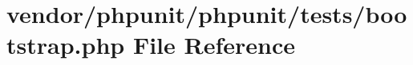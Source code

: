 \section{vendor/phpunit/phpunit/tests/bootstrap.php File Reference}
\label{phpunit_2phpunit_2tests_2bootstrap_8php}
